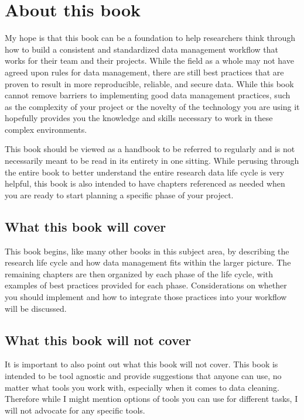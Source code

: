 \documentclass[
]{book}
\begin{document}
\hypertarget{about-this-book}{%
\section{About this book}\label{about-this-book}}

My hope is that this book can be a foundation to help researchers think through how to build a consistent and standardized data management workflow that works for their team and their projects. While the field as a whole may not have agreed upon rules for data management, there are still best practices that are proven to result in more reproducible, reliable, and secure data. While this book cannot remove barriers to implementing good data management practices, such as the complexity of your project or the novelty of the technology you are using \autocite{alston_beginners_2021} it hopefully provides you the knowledge and skills necessary to work in these complex environments.

This book should be viewed as a handbook to be referred to regularly and is not necessarily meant to be read in its entirety in one sitting. While perusing through the entire book to better understand the entire research data life cycle is very helpful, this book is also intended to have chapters referenced as needed when you are ready to start planning a specific phase of your project.

\hypertarget{what-this-book-will-cover}{%
\subsection{What this book will cover}\label{what-this-book-will-cover}}

This book begins, like many other books in this subject area, by describing the research life cycle and how data management fits within the larger picture. The remaining chapters are then organized by each phase of the life cycle, with examples of best practices provided for each phase. Considerations on whether you should implement and how to integrate those practices into your workflow will be discussed.

\hypertarget{what-this-book-will-not-cover}{%
\subsection{What this book will not cover}\label{what-this-book-will-not-cover}}

It is important to also point out what this book will not cover. This book is intended to be tool agnostic and provide suggestions that anyone can use, no matter what tools you work with, especially when it comes to data cleaning. Therefore while I might mention options of tools you can use for different tasks, I will not advocate for any specific tools.
\end{document}
